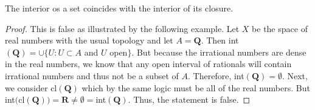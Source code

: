 
\setcounter{question}{12} %
\begin{question}[Ewing]
The interior os a set coincides with the interior of its closure.
\end{question}

\begin{proof}
This is false as illustrated by the following example. Let $X$ be the space of real numbers with the usual topology and let $A=\mathbf{Q}$. Then int$(\mathbf{Q})=\cup\{U:U\subset A$ and $U$ open$\}$. But because the irrational numbers are dense in the real numbers, we know that any open interval of rationals will contain irrational numbers and thus not be a subset of $A$. Therefore, int$(\mathbf{Q})=\emptyset$. Next, we consider cl$(\mathbf{Q})$ which by the same logic must be all of the real numbers. But int$($cl$(\mathbf{Q}))=\mathbf{R}\neq \emptyset=$int$(\mathbf{Q})$. Thus, the statement is false.
\end{proof}

